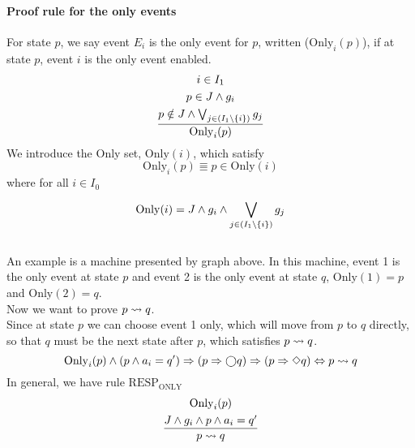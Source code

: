 \paragraph{Proof rule for the only events}
For state $p$, we say event $E_{i}$ is the only event for $p$, written ($\mathrm{Only}_{i}({p})$), if at state $p$, event $i$ is the only event enabled.
\begin{gather*}
  i\in{I_1} \\
  p\in{J}\wedge{g_{i}} \\
  \frac{p\notin{J}\wedge\bigvee_{j\in({I_1}\setminus\{{i}\})}^{} g_{j}}{\mathrm{Only}_{i}({p})}
\end{gather*}
We introduce the Only set, $\mathrm{Only}({i})$, which satisfy
\begin{displaymath}
  \mathrm{Only}_{i}({p})\Equiv{p}\in\mathrm{Only}({i})
\end{displaymath}
where for all $i\in{I_0}$
\begin{displaymath}
  \mathrm{Only}({i}) = {J}\wedge{g_{i}}\wedge\bigvee_{j\in({I_1}\setminus\{{i}\})}^{} g_{j}
\end{displaymath}
\\
An example is a machine presented by graph above. In this machine, event 1 is the only event at state $p$ and event 2 is the only event at state $q$, $\mathrm{Only}(1) = {p}$ and $\mathrm{Only}(2) = {q}$.\\
Now we want to prove $p\rightsquigarrow{q}$.\\
Since at state $p$ we can choose event 1 only, which will move from $p$ to $q$ directly, so that $q$ must be the next state after $p$, which satisfies $p\rightsquigarrow{q}$.
\begin{displaymath}
  \mathrm{Only}_{i}({p})\wedge({p}\wedge{a_{i}} = {q'}) 
  \Rightarrow({p}\Rightarrow\bigcirc{q})
  \Rightarrow({p}\Rightarrow\Diamond{q})
  \Leftrightarrow{p\rightsquigarrow{q}}
\end{displaymath}
In general, we have rule \texttt{$\mathrm{RESP_{ONLY}}$}
\begin{gather*}
  \mathrm{Only}_{i}({p})\\
  \frac{{J}\wedge{g_{i}}\wedge{p}\wedge{a_{i}} = {q'}}{p\rightsquigarrow{q}}
\end{gather*}
